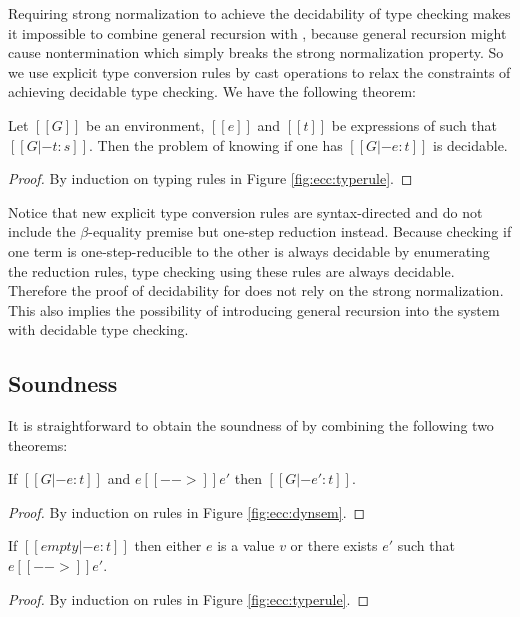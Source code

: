 Requiring strong normalization to achieve the decidability of type checking makes it impossible to combine general recursion with \cc, because general recursion might cause nontermination which simply breaks the strong normalization property. So we use explicit type conversion rules by cast operations to relax the constraints of achieving decidable type checking. We have the following theorem:

\begin{thm}
Let $[[G]]$ be an environment, $[[e]]$ and $[[t]]$ be expressions of \expcc such that $[[G |- t : s]]$. Then the problem of knowing if one has $[[G |- e : t]]$ is decidable.
\end{thm}

\begin{proof}
By induction on typing rules in Figure \ref{fig:ecc:typerule}.
\end{proof}

Notice that new explicit type conversion rules are syntax-directed and do not include the $\beta$-equality premise but one-step reduction instead. Because checking if one term is one-step-reducible to the other is always decidable by enumerating the reduction rules, type checking using these rules are always decidable. Therefore the proof of decidability for \expcc does not rely on the strong normalization. This also implies the possibility of introducing general recursion into the system with decidable type checking.

\subsection{Soundness}

It is straightforward to obtain the soundness of \expcc by combining the following two theorems:

\begin{thm}
  If $[[G |- e:t]]$ and $e [[-->]] e'$ then $[[G |- e':t]]$.
\end{thm}

\begin{proof}
	By induction on rules in Figure \ref{fig:ecc:dynsem}.
\end{proof}

\begin{thm}[Progress]
  If $[[empty |- e:t]]$ then either $e$ is a value $v$ or there exists
  $e'$ such that $e [[-->]] e'$.
\end{thm}

\begin{proof}
	By induction on rules in Figure \ref{fig:ecc:typerule}.
\end{proof}
